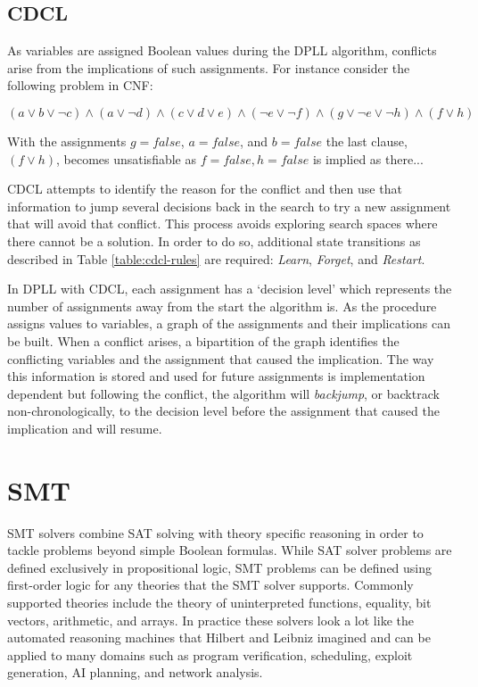 \documentclass[]{final_report}
\begin{document}
\subsection{CDCL}
As variables are assigned Boolean values during the DPLL algorithm, conflicts arise from the implications of such assignments. For instance consider the following problem in CNF:

$(a \lor b \lor \lnot c) \land (a \lor \lnot d) \land (c \lor d \lor e) \land (\lnot{e} \lor \lnot f ) \land (g \lor \lnot{e} \lor \lnot h) \land (f \lor h)$

With the assignments $g = \mathit{false}$, $a = \mathit{false}$, and $b = \mathit{false}$ the last clause, $ (f \lor h) $, becomes unsatisfiable as $\mathit{f} = \mathit{false}, h = \mathit{false}$ is implied as there... 

CDCL attempts to identify the reason for the conflict and then use that information to jump several decisions back in the search to try a new assignment that will avoid that conflict. This process avoids exploring search spaces where there cannot be a solution. In order to do so, additional state transitions as described in Table \ref{table:cdcl-rules} are required: \textit{Learn}, \textit{Forget}, and \textit{Restart}.

In DPLL with CDCL, each assignment has a `decision level' which represents the number of assignments away from the start the algorithm is. As the procedure assigns values to variables, a graph of the assignments and their implications can be built. When a conflict arises, a bipartition of the graph identifies the conflicting variables and the assignment that caused the implication. The way this information is stored and used for future assignments is implementation dependent but following the conflict, the algorithm will \textit{backjump}, or backtrack non-chronologically, to the decision level before the assignment that caused the implication and will resume.

\section{SMT}

SMT solvers combine SAT solving with theory specific reasoning in order to tackle problems beyond simple Boolean formulas. While SAT solver problems are defined exclusively in propositional logic, SMT problems can be defined using first-order logic for any theories that the SMT solver supports. Commonly supported theories include the theory of uninterpreted functions, equality, bit vectors, arithmetic, and arrays. In practice these solvers look a lot like the automated reasoning machines that Hilbert and Leibniz imagined and can be applied to many domains such as program verification, scheduling, exploit generation, AI planning, and network analysis.
\end{document}
